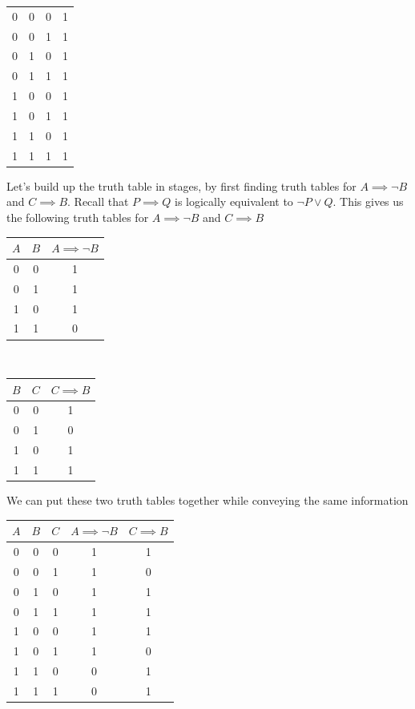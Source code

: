 \documentclass[11pt, preview]{standalone} %
\begin{document}
\begin{enumerate}
\begin{Choices}
\begin{enumerate}[(a)]
\begin{tabular}{ c | c | c || c }
      \hline
      0 & 0 & 0 & 1 \\
      0 & 0 & 1 & 1 \\
      0 & 1 & 0 & 1 \\
      0 & 1 & 1 & 1 \\
      1 & 0 & 0 & 1 \\
      1 & 0 & 1 & 1 \\
      1 & 1 & 0 & 1 \\
      1 & 1 & 1 & 1 
    \end{tabular}
    \Solution Let's build up the truth table in stages, by first finding truth tables for $A \implies \lnot B$ and $C \implies B$. Recall that $P \implies Q$ is logically equivalent to $\lnot P \lor Q$. This gives us the following truth tables for $A \implies \lnot B$ and $C \implies B$

    \begin{tabular}{ c | c || c}
    $A$ & $B$ & $A \implies \lnot B$\\
    \hline
    0 & 0 & 1\\
    0 & 1 & 1\\
    1 & 0 & 1\\
    1 & 1 & 0
    \end{tabular} 
    \\
    \begin{tabular}{ c | c || c}
    $B$ & $C$ & $C \implies B$\\
    \hline
    0 & 0 & 1\\
    0 & 1 & 0\\
    1 & 0 & 1\\
    1 & 1 & 1
    \end{tabular}

    We can put these two truth tables together while conveying the same information

    \begin{tabular}{ c | c | c || c | c}
    $A$ & $B$ & $C$ & $A \implies \lnot B$ & $C \implies B$\\
    \hline
    0 & 0 & 0 & 1 & 1\\
    0 & 0 & 1 & 1 & 0\\
    0 & 1 & 0 & 1 & 1\\
    0 & 1 & 1 & 1 & 1\\
    1 & 0 & 0 & 1 & 1\\
    1 & 0 & 1 & 1 & 0\\
    1 & 1 & 0 & 0 & 1\\
    1 & 1 & 1 & 0 & 1
    \end{tabular}


\end{enumerate}
\end{Choices}
\end{enumerate}
\end{document}
